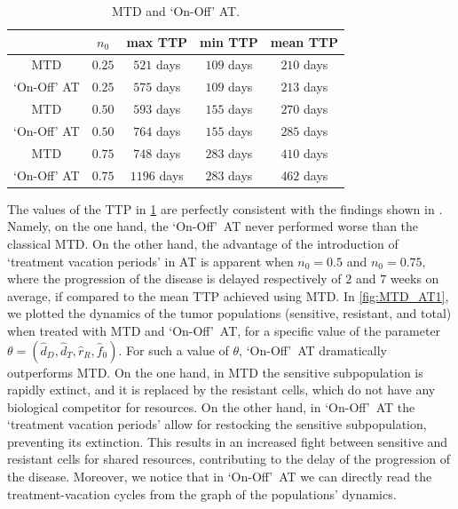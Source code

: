 \documentclass[a4paper,12pt, reqno]{amsart}
\theoremstyle{plain}
\theoremstyle{definition}
\theoremstyle{remark}
\numberwithin{equation}{section}
\begin{document}
\begin{table}[h]
\scriptsize
\caption{MTD and `On-Off' AT.}
\label{table:MTD_AT1}

\centering
\begin{tabular}{c c c c c}
\toprule
& $n_0$ & max TTP & min TTP & mean TTP \\
\midrule
MTD & $0.25$ & $521$ days & $109$ days & $210$ days \\
`On-Off' AT & $0.25$ & $575$ days & $109$ days & $213$ days \\
\midrule
MTD & $0.50$ & $593$ days & $155$ days & $270$ days \\
`On-Off' AT & $0.50$ & $764$ days & $155$ days & $285$ days \\
\midrule
MTD & $0.75$ & $748$ days & $283$ days & $410$ days \\
`On-Off' AT & $0.75$ & $1196$ days & $283$ days & $462$ days \\
\bottomrule
\end{tabular}

\vspace{5pt}
\end{table}
\noindent
The values of the TTP in \cref{table:MTD_AT1} are perfectly consistent with the findings shown in \cite[Figure~3.A]{turnover2021}. Namely, on the one hand, the `On-Off'~AT never performed worse than the classical MTD. 
On the other hand, the advantage of the introduction of `treatment vacation periods' in AT is apparent when $n_0=0.5$ and $n_0=0.75$, where the progression of the disease is delayed respectively of $2$ and $7$ weeks on average, if compared to the mean TTP achieved using MTD.
In \cref{fig:MTD_AT1}, we plotted the {dynamics} of the tumor populations (sensitive, resistant, and total) when treated with MTD and `On-Off'~AT, for a specific value of the parameter $\theta= (\hat d_D, \hat d_T, \hat r_R, \hat f_0)$. For such a value of $\theta$, `On-Off'~AT dramatically outperforms MTD.
On the one hand, in MTD the sensitive sub\-population is rapidly extinct, and it is replaced by the resistant cells, which do not have any biological competitor for resources.
On the other hand, in `On-Off'~AT the `treatment vacation periods' allow for restocking the sensitive subpopulation, preventing its extinction. This results in an increased fight between sensitive and resistant cells for shared resources, contributing to the delay of the progression of the disease. Moreover, we notice that in `On-Off'~AT we can directly read the treatment-vacation cycles from the graph of the populations' {dynamics}.
\end{document}
